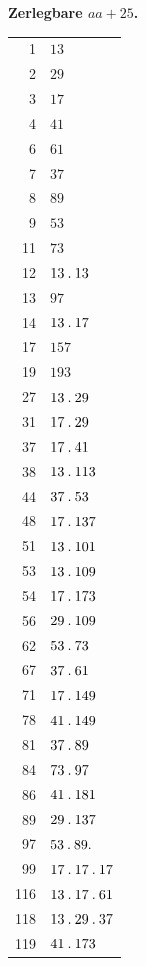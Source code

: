 %
\par{}
\begin{center}\textbf{Zerlegbare $aa+25$.}\end{center}
\begingroup\small\setlength{\tabcolsep}{5pt}
\begin{longtable}{@{}r|l@{}}
1 & $13$\\
2 & $29$\\
3 & $17$\\
4 & $41$\\
6 & $61$\\
7 & $37$\\
8 & $89$\\
9 & $53$\\
11 & $73$\\
12 & $13\mathbin{.} 13$\\
13 & $97$\\
14 & $13\mathbin{.} 17$\\
17 & $157$\\
19 & $193$\\
27 & $13\mathbin{.} 29$\\
31 & $17\mathbin{.} 29$\\
37 & $17\mathbin{.} 41$\\
38 & $13\mathbin{.} 113$\\
44 & $37\mathbin{.} 53$\\
48 & $17\mathbin{.} 137$\\
51 & $13\mathbin{.} 101$\\
53 & $13\mathbin{.} 109$\\
54 & $17\mathbin{.} 173$\\
56 & $29\mathbin{.} 109$\\
62 & $53\mathbin{.} 73$\\
67 & $37\mathbin{.} 61$\\
71 & $17\mathbin{.} 149$\\
78 & $41\mathbin{.} 149$\\
81 & $37\mathbin{.} 89$\\
84 & $73\mathbin{.} 97$\\
86 & $41\mathbin{.} 181$\\
89 & $29\mathbin{.} 137$\\
97 & $53\mathbin{.} 89\mathbin{.} $\\
99 & $17\mathbin{.} 17\mathbin{.} 17$\\
116 & $13\mathbin{.} 17\mathbin{.} 61$\\
118 & $13\mathbin{.} 29\mathbin{.} 37$\\
119 & $41\mathbin{.} 173$\\

\end{longtable}
